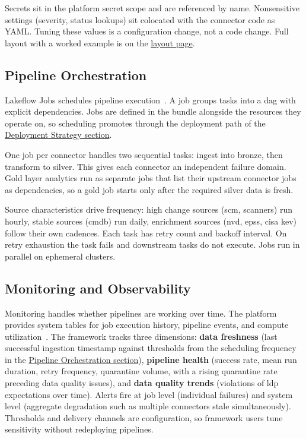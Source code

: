 Secrets sit in the platform secret scope and are referenced by name. Nonsensitive settings (severity, status lookups) sit colocated with the connector code as YAML. Tuning these values is a configuration change, not a code change. Full layout with a worked example is on the \href{https://vkraus.github.io/appsec-mvp/platform/reference/project-layout/}{layout page}.


\subsection{Pipeline Orchestration}
\label{sec:orchestration}

Lakeflow Jobs schedules pipeline execution~\cite{DatabricksLakeflowJobs2026}. A job groups tasks into a \gls{dag} with explicit dependencies. Jobs are defined in the bundle alongside the resources they operate on, so scheduling promotes through the deployment path of the \hyperref[sec:deployment-strategy]{Deployment Strategy section}.

One job per connector handles two sequential tasks: ingest into bronze, then transform to silver. This gives each connector an independent failure domain. Gold layer analytics run as separate jobs that list their upstream connector jobs as dependencies, so a gold job starts only after the required silver data is fresh.

Source characteristics drive frequency: high change sources (\gls{scm}, scanners) run hourly, stable sources (\gls{cmdb}) run daily, enrichment sources (\gls{nvd}, \gls{epss}, \gls{cisa} \gls{kev}) follow their own cadences. Each task has retry count and backoff interval. On retry exhaustion the task fails and downstream tasks do not execute. Jobs run in parallel on ephemeral clusters.


\subsection{Monitoring and Observability}

Monitoring handles whether pipelines are working over time. The platform provides system tables for job execution history, pipeline events, and compute utilization~\cite{DatabricksObservability2026}. The framework tracks three dimensions: \textbf{data freshness} (last successful ingestion timestamp against thresholds from the scheduling frequency in the \hyperref[sec:orchestration]{Pipeline Orchestration section}), \textbf{pipeline health} (success rate, mean run duration, retry frequency, quarantine volume, with a rising quarantine rate preceding data quality issues), and \textbf{data quality trends} (violations of \gls{ldp} expectations over time). Alerts fire at job level (individual failures) and system level (aggregate degradation such as multiple connectors stale simultaneously). Thresholds and delivery channels are configuration, so framework users tune sensitivity without redeploying pipelines.

